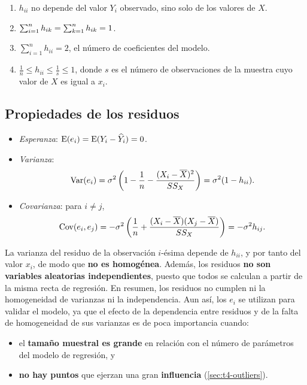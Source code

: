 \begin{proposicion}
  \begin{enumerate}
    \item $h_{ii}$ no depende del valor $Y_i$ observado, sino solo de los valores de $X$.
    \item $\sum_{i=1}^n h_{ik} = \sum_{k=1}^{n} h_{ik} = 1$.
    \item $\sum_{i=1}^n h_{ii} = 2$, el número de coeficientes del modelo.
    \item $\frac1n \le h_{ii} \le \frac1s \le 1$, donde $s$ es el número de observaciones de la
      muestra cuyo valor de $X$ es igual a $x_i$.
  \end{enumerate}
\end{proposicion}

\subsection{Propiedades de los residuos}

\begin{proposicion}
  \begin{itemize}
    \item \emph{Esperanza}: $\operatorname{E}(e_i)=\operatorname{E}(Y_i-\widehat{Y}_i)=0$.
    \item \emph{Varianza}:
      \[
        \operatorname{Var}(e_i) = \sigma^2\left(1-\frac1n-\frac{(X_i-\overline{X})^2}{SS_X}\right)
        = \sigma^2(1-h_{ii}).
      \]
    \item \emph{Covarianza}: para $i\neq j$,
      \[
        \operatorname{Cov}(e_i,e_j) = -\sigma^2\left(\frac1n+\frac{(X_i-\overline{X})(X_j-\overline{X})}{SS_X}\right)
        = -\sigma^2h_{ij}.
      \]
  \end{itemize}
\end{proposicion}

La varianza del residuo de la observación $i$-ésima depende de $h_{ii}$, y por tanto del valor
$x_i$, de modo que \textbf{no es homogénea}. Además, los residuos \textbf{no son variables
aleatorias independientes}, puesto que todos se calculan a partir de la misma recta de
regresión. En resumen, los residuos no cumplen ni la homogeneidad de varianzas ni la
independencia. Aun así, los $e_i$ se utilizan para validar el modelo, ya que el efecto de la
dependencia entre residuos y de la falta de homogeneidad de sus varianzas es de poca
importancia cuando:
\begin{itemize}
  \item el \textbf{tamaño muestral es grande} en relación con el número de parámetros del modelo
    de regresión, y
  \item \textbf{no hay puntos} que ejerzan una gran \textbf{influencia}
    (\cref{sec:t4-outliers}).
\end{itemize}

